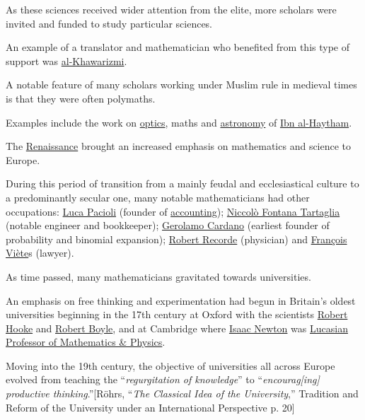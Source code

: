 \documentclass{article}
\begin{document}
As these sciences received wider attention from the elite, more scholars were invited and funded to study particular sciences.

An example of a translator and mathematician who benefited from this type of support was \href{https://en.wikipedia.org/wiki/Al-Khawarizmi}{al-Khawarizmi}.

A notable feature of many scholars working under Muslim rule in medieval times is that they were often polymaths.

Examples include the work on \href{https://en.wikipedia.org/wiki/Optics}{optics}, maths and \href{https://en.wikipedia.org/wiki/Astronomy}{astronomy} of \href{https://en.wikipedia.org/wiki/Ibn_al-Haytham}{Ibn al-Haytham}.

%
The \href{https://en.wikipedia.org/wiki/Renaissance}{Renaissance} brought an increased emphasis on mathematics and science to Europe.

During this period of transition from a mainly feudal and ecclesiastical culture to a predominantly secular one, many notable mathematicians had other occupations: \href{https://en.wikipedia.org/wiki/Luca_Pacioli}{Luca Pacioli} (founder of \href{https://en.wikipedia.org/wiki/Accounting}{accounting}); \href{https://en.wikipedia.org/wiki/Niccol%C3%B2_Fontana_Tartaglia}{Niccolò Fontana Tartaglia} (notable engineer and bookkeeper); \href{https://en.wikipedia.org/wiki/Gerolamo_Cardano}{Gerolamo Cardano} (earliest founder of probability and binomial expansion); \href{https://en.wikipedia.org/wiki/Robert_Recorde}{Robert Recorde} (physician) and \href{https://en.wikipedia.org/wiki/Fran%C3%A7ois_Vi%C3%A8te}{François Viète}s (lawyer). 

%
As time passed, many mathematicians gravitated towards universities.

An emphasis on free thinking and experimentation had begun in Britain's oldest universities beginning in the 17th century at Oxford with the scientists \href{https://en.wikipedia.org/wiki/Robert_Hooke}{Robert Hooke} and \href{https://en.wikipedia.org/wiki/Robert_Boyle}{Robert Boyle}, and at Cambridge where \href{https://en.wikipedia.org/wiki/Isaac_Newton}{Isaac Newton} was \href{https://en.wikipedia.org/wiki/Lucasian_Professor_of_Mathematics}{Lucasian Professor of Mathematics \& Physics}.

Moving into the 19th century, the objective of universities all across Europe evolved from teaching the ``\textit{regurgitation of knowledge}'' to ``\textit{encourag[ing] productive thinking}.''[Röhrs, ``\textit{The Classical Idea of the University},'' Tradition and Reform of the University under an International Perspective p. 20]
\end{document}

